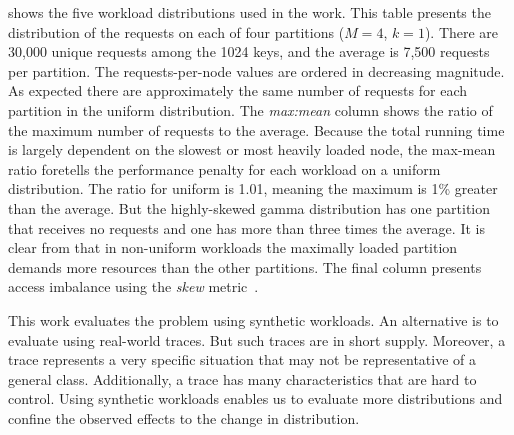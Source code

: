 \mytable{\ref{tab:load-imbalance}} shows
the five workload distributions used in the work.
This table presents the distribution of the
requests on each of four partitions ($M=4$, $k=1$).
There are 30,000 unique requests among the 1024 keys,
and the average is 7,500 requests per partition.
The requests-per-node values are ordered in decreasing magnitude.
As expected there are approximately the same number of requests for
each partition in the uniform distribution.
The \emph{max:mean} column shows the ratio of the maximum number of requests
to the average.
Because the total running time is largely dependent on the slowest or
most heavily loaded node, the max-mean ratio foretells the performance
penalty for each workload on a uniform distribution.
The ratio for uniform is 1.01, meaning the maximum is 1\% greater
than the average.
But the highly-skewed gamma distribution has one partition that receives
no requests and one has more than three times the average.
It is clear from \mytable{\ref{tab:load-imbalance}} that in
non-uniform workloads
the maximally loaded partition demands
more resources than the other partitions.
The final column presents access imbalance using the 
\emph{skew} metric~\cite{Pavlo2012}. 

This work evaluates the problem using synthetic workloads.
An alternative is to evaluate using real-world traces.
But such traces are in short supply.
Moreover, a trace represents a very specific situation that may not be
representative of a general class.
Additionally, a trace has many characteristics that are hard to
control.
Using synthetic workloads enables us to evaluate more distributions and
confine the observed effects to the change in distribution.


